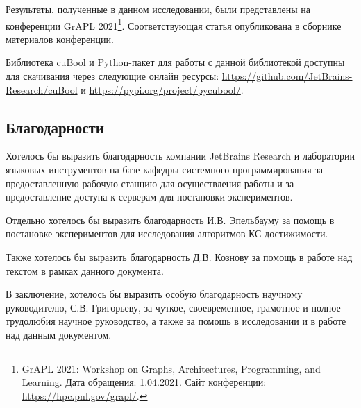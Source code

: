 Результаты, полученные в данном исследовании, были представлены на конференции GrAPL 2021\footnote{GrAPL 2021: Workshop on Graphs, Architectures, Programming, and Learning. Дата обращения: 1.04.2021. Сайт конференции: \url{https://hpc.pnl.gov/grapl/}.}. Соответствующая статья опубликована в сборнике материалов конференции.

Библиотека cuBool и Python-пакет для работы с данной библиотекой доступны для скачивания через следующие онлайн ресурсы: \url{https://github.com/JetBrains-Research/cuBool} и \url{https://pypi.org/project/pycubool/}.

\subsection*{Благодарности}

Хотелось бы выразить благодарность компании JetBrains Research и лаборатории языковых инструментов на базе кафедры системного программирования за предоставленную рабочую станцию для осуществления работы и за предоставление доступа к серверам для постановки экспериментов.

Отдельно хотелось бы выразить благодарность И.В. Эпельбауму за помощь в постановке экспериментов для исследования алгоритмов КС достижимости.

Также хотелось бы выразить благодарность Д.В. Кознову за помощь в работе над текстом в рамках данного документа.

В заключение, хотелось бы выразить особую благодарность научному руководителю, С.В. Григорьеву, за чуткое, своевременное, грамотное и полное трудолюбия научное руководство, а также за помощь в исследовании и в работе над данным документом. 

